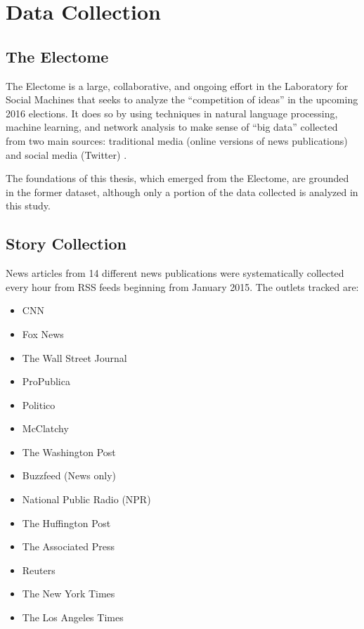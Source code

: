 \chapter{Data Collection}

\section{The Electome}

The Electome is a large, collaborative, and ongoing effort in the Laboratory for Social Machines that seeks to analyze the ``competition of ideas'' in the upcoming 2016 elections. It does so by using techniques in natural language processing, machine learning, and network analysis to make sense of ``big data'' collected from two main sources: traditional media (online versions of news publications) and social media (Twitter) \cite{vvr_electome2016}. 

The foundations of this thesis, which emerged from the Electome, are grounded in the former dataset, although only a portion of the data collected is analyzed in this study.

\section{Story Collection} 

News articles from 14 different news publications were systematically collected every hour from RSS feeds beginning from January 2015. The outlets tracked are:
 

\begin{multicols}{2}
    \begin{itemize}
    \itemsep-1em 
      \item CNN
      \item Fox News
      \item The Wall Street Journal
      \item ProPublica
      \item Politico
      \item McClatchy
      \item The Washington Post
      \item Buzzfeed (News only)
      \item National Public Radio (NPR)
      \item The Huffington Post
      \item The Associated Press
      \item Reuters
      \item The New York Times
      \item The Los Angeles Times
    \end{itemize}
\end{multicols}

